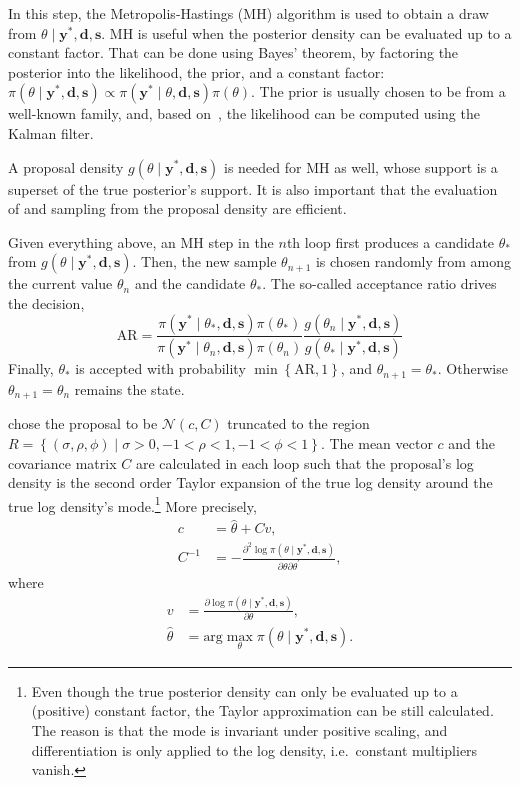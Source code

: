 In this step, the Metropolis-Hastings (MH) algorithm is used to obtain a draw from $\theta\mid\bm{y}^\ast,\bm{d},\bm s$.
MH is useful when the posterior density can be evaluated up to a constant factor.
That can be done using Bayes' theorem, by factoring the posterior into the likelihood, the prior, and a constant factor: $\pi(\theta\mid\bm{y}^\ast,\bm{d},\bm s)\propto\pi(\bm{y}^\ast\mid\theta,\bm{d},\bm s)\pi(\theta)$.
The prior is usually chosen to be from a well-known family, and, based on~\cite{Nakajima2009}, the likelihood can be computed using the Kalman filter.

A proposal density $g(\theta\mid\bm{y}^\ast,\bm{d},\bm s)$ is needed for MH as well, whose support is a superset of the true posterior's support.
It is also important that the evaluation of and sampling from the proposal density are efficient.

Given everything above, an MH step in the $n$th loop first produces a candidate $\theta_\ast$ from $g(\theta\mid\bm{y}^\ast,\bm{d},\bm s)$.
Then, the new sample $\theta_{n+1}$ is chosen randomly from among the current value $\theta_n$ and the candidate $\theta_\ast$.
The so-called acceptance ratio drives the decision,
\begin{equation*}
\text{AR}=\frac{\pi(\bm{y}^\ast\mid\theta_\ast,\bm{d},\bm s)\pi(\theta_\ast)}{\pi(\bm{y}^\ast\mid\theta_n,\bm{d},\bm s)\pi(\theta_n)}\frac{g(\theta_n\mid\bm{y}^\ast,\bm{d},\bm s)}{g(\theta_\ast\mid\bm{y}^\ast,\bm{d},\bm s)}
\end{equation*}
Finally, $\theta_\ast$ is accepted with probability $\min\left\{\text{AR},1\right\}$, and $\theta_{n+1}=\theta_\ast$.
Otherwise $\theta_{n+1}=\theta_n$ remains the state.

\citet{Nakajima2009} chose the proposal to be $\mathcal{N}(c, C)$ truncated to the region $R=\left\{(\sigma,\rho,\phi)\mid\sigma>0,-1<\rho<1,-1<\phi<1\right\}$.
The mean vector $c$ and the covariance matrix $C$ are calculated in each loop such that the proposal's log density is the second order Taylor expansion of the true log density around the true log density's mode.\footnote{
	Even though the true posterior density can only be evaluated up to a (positive) constant factor, the Taylor approximation can be still calculated.
	The reason is that the mode is invariant under positive scaling, and differentiation is only applied to the log density, i.e.\ constant multipliers vanish.}
More precisely,
\begin{align*}
c &= \hat{\theta}+Cv, \\
C^{-1} &= -\frac{\partial^2\log\pi(\theta\mid\bm{y}^\ast,\bm{d},\bm s)}{\partial\theta\partial\theta^\prime},
\end{align*}
where
\begin{align*}
v &= \frac{\partial\log\pi(\theta\mid\bm{y}^\ast,\bm{d},\bm s)}{\partial\theta}, \\
\hat{\theta} &= \text{arg}\max_\theta\pi(\theta\mid\bm{y}^\ast,\bm{d},\bm s).
\end{align*}

